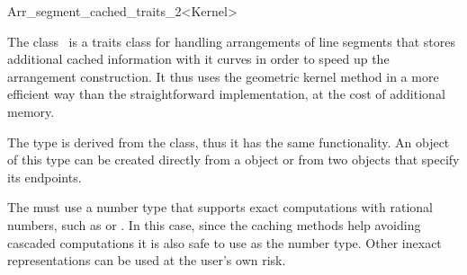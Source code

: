 
\ccRefPageBegin


\begin{ccRefClass}{Arr_segment_cached_traits_2<Kernel>}

\ccDefinition
   The class \ccRefName\ is a traits class for handling arrangements of line
   segments that stores additional cached information with it curves in order
   to speed up the arrangement construction. It thus uses the geometric kernel
   method in a more efficient way than the straightforward implementation, at
   the cost of additional memory.

   The  type is derived from the
    class, thus it has the same functionality. An
   object of this type can be created directly from a  
   object or from two  objects that specify its 
   endpoints.

   The  must use a number type that supports exact computations
   with rational numbers, such as  or .
   In this case, since the caching methods help avoiding cascaded computations
   it is also safe to use  as the number type.
   Other inexact representations can be used at the user's own risk.


\ccIsModel
     


\end{ccRefClass} %

\ccRefPageEnd
